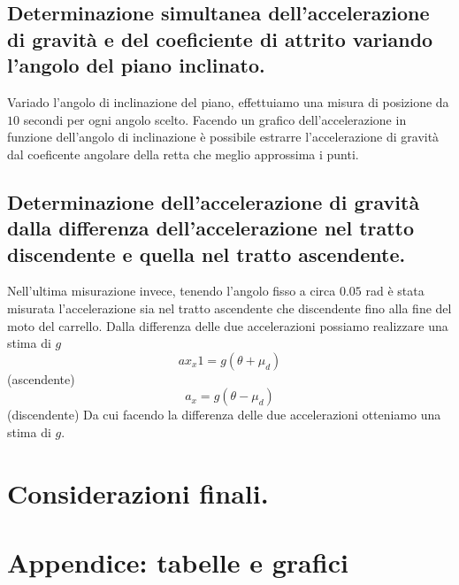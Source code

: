 \documentclass[10pt,oneside,a4paper]{article}
\begin{document}
\subsection{Determinazione simultanea dell'accelerazione di gravità e del coeficiente di attrito variando l'angolo del piano inclinato.}
Variado l'angolo di inclinazione del piano, effettuiamo una misura di posizione da $10$ secondi per ogni angolo scelto. Facendo un grafico dell'accelerazione in funzione dell'angolo di inclinazione è possibile estrarre l'accelerazione di gravità dal coeficente angolare della retta che meglio approssima i punti. 



\subsection{Determinazione dell'accelerazione di gravità dalla differenza dell'accelerazione nel tratto discendente e quella nel tratto ascendente.}
Nell'ultima misurazione invece, tenendo l'angolo fisso a circa $0.05$ rad è stata misurata l'accelerazione sia nel tratto ascendente che discendente fino alla fine del moto del carrello. Dalla differenza delle due accelerazioni possiamo realizzare una stima di $g$
	\begin{equation}
	ax_x1= g(\theta + \mu_d) 
	\end{equation} (ascendente)\newline
	\begin{equation}
	a_x = g(\theta - \mu_d)
	\end{equation} (discendente)
Da cui facendo la differenza delle due accelerazioni otteniamo una stima di $g$.





\section{Considerazioni finali.}




\newpage
\section{Appendice: tabelle e grafici}
\end{document}
